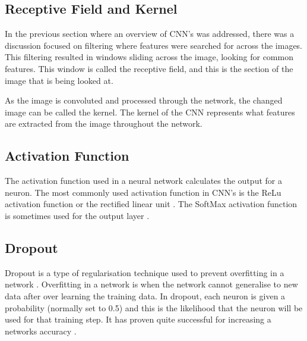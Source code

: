
\subsection*{Receptive Field and Kernel}
In the previous section where an overview of CNN's was addressed, there was a discussion focused on filtering where features were searched for across the images.
This filtering resulted in windows sliding across the image, looking for common features.
This window is called the receptive field, and this is the section of the image that is being looked at.

As the image is convoluted and processed through the network, the changed image can be called the kernel.
The kernel of the CNN represents what features are extracted from the image throughout the network.

\subsection*{Activation Function}
The activation function used in a neural network calculates the output for a neuron.
The most commonly used activation function in CNN's is the ReLu activation function or the rectified linear unit \parencite{handsOnML}.
The SoftMax activation function is sometimes used for the output layer \parencite{handsOnML}.

\subsection*{Dropout}
Dropout is a type of regularisation technique used to prevent overfitting in a network \parencite{handsOnML}.
Overfitting in a network is when the network cannot generalise to new data after over learning the training data.
In dropout, each neuron is given a probability (normally set to 0.5) and this is the likelihood that the neuron will be used for that training step.
It has proven quite successful for increasing a networks accuracy \parencite{handsOnML}.

